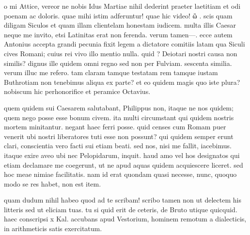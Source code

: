 


 o mi Attice, vereor ne nobis Idus Martiae nihil dederint praeter laetitiam et odi poenam ac doloris. quae mihi istim adferuntur! quae hic video! ὢ . scis quam diligam Siculos et quam illam clientelam honestam iudicem. multa illis Caesar neque me invito, etsi Latinitas erat non ferenda. verum tamen—. ecce autem Antonius accepta grandi pecunia fixit legem a dictatore comitiis latam qua Siculi cives Romani; cuius rei vivo illo mentio nulla. quid ? Deiotari nostri causa non similis? dignus ille quidem omni regno sed non per Fulviam. sescenta similia. verum illuc me refero. tam claram tamque testatam rem tamque iustam Buthrotiam non tenebimus aliqua ex parte? et eo quidem magis quo iste plura? nobiscum hic perhonorifice et peramice Octavius.

 quem quidem sui Caesarem salutabant, Philippus non, itaque ne nos quidem; quem nego posse esse bonum civem. ita multi circumstant qui quidem nostris mortem minitantur. negant haec ferri posse. quid censes cum Romam puer venerit ubi nostri liberatores tuti esse non possunt? qui quidem semper erunt clari, conscientia vero facti sui etiam beati. sed nos, nisi me fallit, iacebimus. itaque exire aveo ubi nec Pelopidarum, inquit. haud amo vel hos designatos qui etiam declamare me coegerunt, ut ne apud aquas quidem acquiescere liceret. sed hoc meae nimiae facilitatis. nam id erat quondam quasi necesse, nunc, quoquo modo se res habet, non est item.

 quam dudum nihil habeo quod ad te scribam! scribo tamen non ut delectem his litteris sed ut eliciam tuas. tu si quid erit de ceteris, de Bruto utique quicquid. haec conscripsi x Kal. accubans apud Vestorium, hominem remotum a dialecticis, in arithmeticis satis exercitatum.
